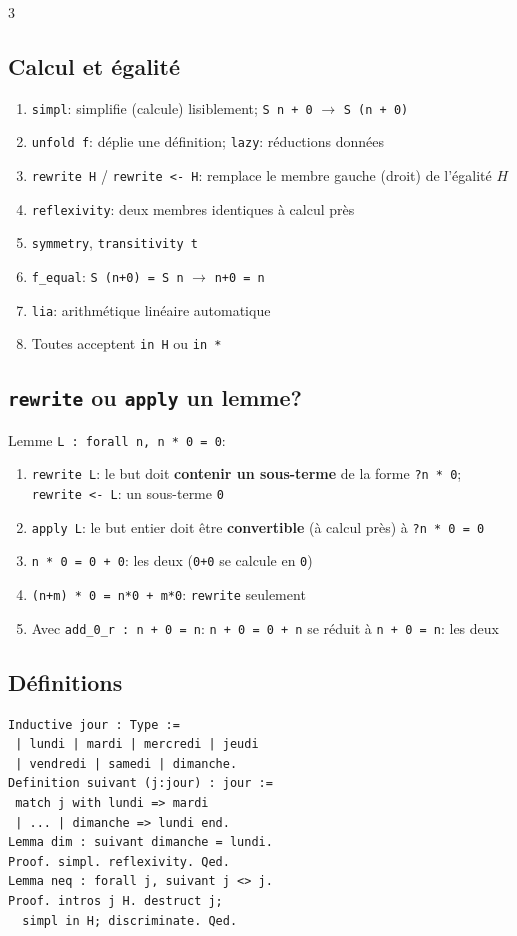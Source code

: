\documentclass[12pt, a4paper]{article}
\begin{document}
\begin{multicols*}{3}
	\subsection{Calcul et égalité}
	\begin{enumerate}[\roman*.]
		\item \texttt{simpl}: simplifie (calcule) lisiblement; \texttt{S n + 0} $\to$ \texttt{S (n + 0)}
		\item \texttt{unfold f}: déplie une définition; \texttt{lazy}: réductions données
		\item \texttt{rewrite H} / \texttt{rewrite <- H}: remplace le membre gauche (droit) de l'égalité $H$
		\item \texttt{reflexivity}: deux membres identiques à calcul près
		\item \texttt{symmetry}, \texttt{transitivity t}
		\item \texttt{f\_equal}: \texttt{S (n+0) = S n} $\to$ \texttt{n+0 = n}
		\item \texttt{lia}: arithmétique linéaire automatique
		\item Toutes acceptent \texttt{in H} ou \texttt{in *}
	\end{enumerate}

	\subsection{\texttt{rewrite} ou \texttt{apply} un lemme?}
	Lemme \texttt{L : forall n, n * 0 = 0}:
	\begin{enumerate}[\roman*.]
		\item \texttt{rewrite L}: le but doit \textbf{contenir un sous-terme} de la forme \texttt{?n * 0}; \texttt{rewrite <- L}: un sous-terme \texttt{0}
		\item \texttt{apply L}: le but entier doit être \textbf{convertible} (à calcul près) à \texttt{?n * 0 = 0}
		\item \texttt{n * 0 = 0 + 0}: les deux (\texttt{0+0} se calcule en \texttt{0})
		\item \texttt{(n+m) * 0 = n*0 + m*0}: \texttt{rewrite} seulement
		\item Avec \texttt{add\_0\_r : n + 0 = n}: \texttt{n + 0 = 0 + n} se réduit à \texttt{n + 0 = n}: les deux
	\end{enumerate}

	\colbreak
	\subsection{Définitions}
\begin{verbatim}
Inductive jour : Type :=
 | lundi | mardi | mercredi | jeudi
 | vendredi | samedi | dimanche.
Definition suivant (j:jour) : jour :=
 match j with lundi => mardi
 | ... | dimanche => lundi end.
Lemma dim : suivant dimanche = lundi.
Proof. simpl. reflexivity. Qed.
Lemma neq : forall j, suivant j <> j.
Proof. intros j H. destruct j;
  simpl in H; discriminate. Qed.


\end{verbatim}
\end{multicols*}
\end{document}
